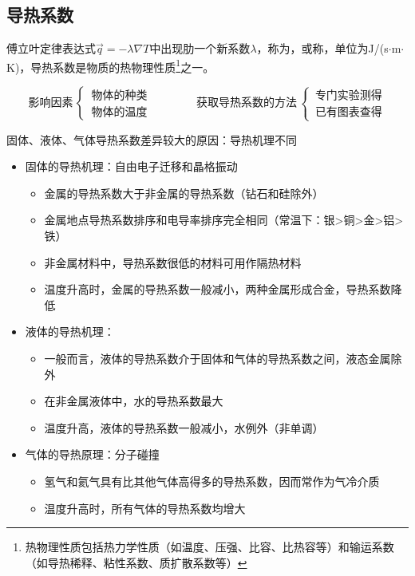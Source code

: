 \subsection{导热系数}
	傅立叶定律表达式$\vec{q} = -\lambda \nabla T$中出现肋一个新系数$\lambda$，称为，或称，单位为J/(s$\cdot$m$\cdot$K)，导热系数是物质的热物理性质\footnote{热物理性质包括热力学性质（如温度、压强、比容、比热容等）和输运系数（如导热稀释、粘性系数、质扩散系数等）}之一。
	
\begin{equation*}
	\mbox{影响因素}\,
	\begin{cases}
		\, \mbox{物体的种类}\\
		\, \mbox{物体的温度}
	\end{cases}
	\quad \quad \quad \quad 
	\mbox{获取导热系数的方法}\,
	\begin{cases}
		\, \mbox{专门实验测得}\\
		\, \mbox{已有图表查得}
	\end{cases}
\end{equation*}

固体、液体、气体导热系数差异较大的原因：导热机理不同
\begin{itemize}
	\item 固体的导热机理：自由电子迁移和晶格振动\vspace*{-0.5em}
	\begin{itemize}
		\item 金属的导热系数大于非金属的导热系数（钻石和硅除外）\vspace*{-0.5em}
		\item 金属地点导热系数排序和电导率排序完全相同（常温下：银>铜>金>铝>铁）\vspace*{-0.5em}
		\item 非金属材料中，导热系数很低的材料可用作隔热材料\vspace*{-0.5em}
		\item 温度升高时，金属的导热系数一般减小，两种金属形成合金，导热系数降低
	\end{itemize}
	\item 液体的导热机理：\vspace*{-0.5em}
	\begin{itemize}
		\item 一般而言，液体的导热系数介于固体和气体的导热系数之间，液态金属除外\vspace*{-0.5em}
		\item 在非金属液体中，水的导热系数最大\vspace*{-0.5em}
		\item 温度升高，液体的导热系数一般减小，水例外（非单调）
	\end{itemize}
	\item 气体的导热原理：分子碰撞\vspace*{-0.5em}
	\begin{itemize}
		\item 氢气和氦气具有比其他气体高得多的导热系数，因而常作为气冷介质\vspace*{-0.5em}
		\item 温度升高时，所有气体的导热系数均增大
	\end{itemize}
\end{itemize}

